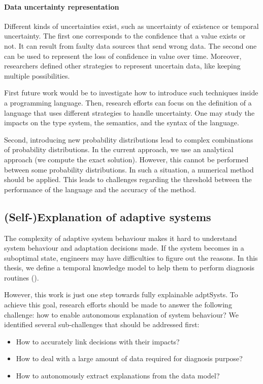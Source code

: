 \paragraph{Data uncertainty representation}
Different kinds of uncertainties exist, such as uncertainty of existence or temporal uncertainty.
The first one corresponds to the confidence that a value exists or not.
It can result from faulty data sources that send wrong data.
The second one can be used to represent the loss of confidence in value over time.
Moreover, researchers defined other strategies to represent uncertain data, like keeping multiple possibilities.

First future work would be to investigate how to introduce such techniques inside a programming language.
Then, research efforts can focus on the definition of a language that uses different strategies to handle uncertainty.
One may study the impacts on the type system, the semantics, and the syntax of the language.

Second, introducing new probability distributions lead to complex combinations of probability distributions.
In the current approach, we use an analytical approach (we compute the exact solution).
However, this cannot be performed between some probability distributions.
In such a situation, a numerical method should be applied.
This leads to challenges regarding the threshold between the performance of the language and the accuracy of the method.

\subsection{(Self-)Explanation of adaptive systems}

The complexity of adaptive system behaviour makes it hard to understand system behaviour and adaptation decisions made.
If the system becomes in a suboptimal state, engineers may have difficulties to figure out the reasons.
In this thesis, we define a  temporal knowledge model to help them to perform diagnosis routines (\cf {}).

However, this work is just one step towards fully explainable \glspl{adptSyst}.
To achieve this goal, research efforts should be made to answer the following challenge: how to enable autonomous explanation of system behaviour?
We identified several sub-challenges that should be addressed first:
\begin{itemize}
	\item How to accurately link decisions with their impacts?
	\item How to deal with a large amount of data required for diagnosis purpose?
	\item How to autonomously extract explanations from the data model?
\end{itemize}

